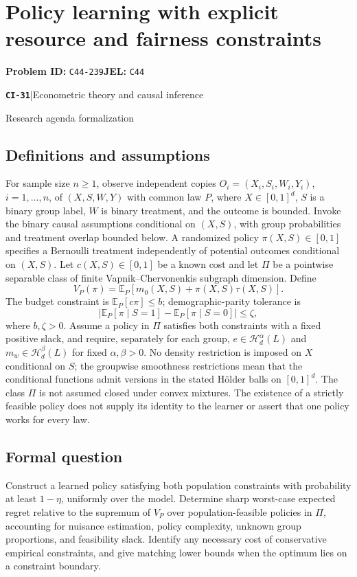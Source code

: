 \documentclass[11pt,a4paper]{article}
\newcommand{\E}{\mathbb E}
\newcommand{\entrymeta}[3]{{\sffamily\small\color{muted}\textbf{\texttt{#1}}\quad|\quad #2\par #3\par}}
\begin{document}
\section*{Policy learning with explicit resource and fairness constraints}
\textbf{Problem ID:} \texttt{C44-239}\quad \textbf{JEL:} \texttt{C44}\par
\label{problem:OP-0510}
\label{beyond:CI-31}
\entrymeta{CI-31}{Econometric theory and causal inference}{Research agenda formalization}
\subsection*{Definitions and assumptions}
For sample size $n\geq1$, observe independent copies $O_i=(X_i,S_i,W_i,Y_i)$, $i=1,\ldots,n$, of $(X,S,W,Y)$ with common law $P$, where $X\in[0,1]^d$, $S$ is a binary group label, $W$ is binary treatment, and the outcome is bounded. Invoke the binary causal assumptions conditional on $(X,S)$, with group probabilities and treatment overlap bounded below. A randomized policy $\pi(X,S)\in[0,1]$ specifies a Bernoulli treatment independently of potential outcomes conditional on $(X,S)$. Let $c(X,S)\in[0,1]$ be a known cost and let $\Pi$ be a pointwise separable class of finite Vapnik--Chervonenkis subgraph dimension. Define
\[
 V_P(\pi)=\E_P[m_0(X,S)+\pi(X,S)\tau(X,S)].
\]
The budget constraint is $\E_P[c\pi]\leq b$; demographic-parity tolerance is
\[
 |\E_P[\pi\mid S=1]-\E_P[\pi\mid S=0]|\leq\zeta,
\]
where $b,\zeta>0$. Assume a policy in $\Pi$ satisfies both constraints with a fixed positive slack, and require, separately for each group, $e\in\mathcal H_d^\alpha(L)$ and $m_w\in\mathcal H_d^\beta(L)$ for fixed $\alpha,\beta>0$.
No density restriction is imposed on $X$ conditional on $S$; the groupwise smoothness restrictions mean that the conditional functions admit versions in the stated H\"older balls on $[0,1]^d$. The class $\Pi$ is not assumed closed under convex mixtures. The existence of a strictly feasible policy does not supply its identity to the learner or assert that one policy works for every law.
\subsection*{Formal question}
Construct a learned policy satisfying both population constraints with probability at least $1-\eta$, uniformly over the model. Determine sharp worst-case expected regret relative to the supremum of $V_P$ over population-feasible policies in $\Pi$, accounting for nuisance estimation, policy complexity, unknown group proportions, and feasibility slack. Identify any necessary cost of conservative empirical constraints, and give matching lower bounds when the optimum lies on a constraint boundary.
\end{document}
